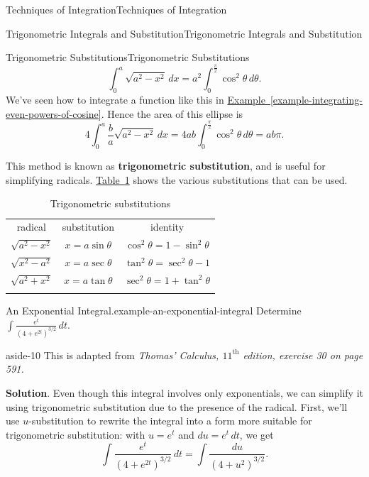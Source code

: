 \documentclass[10pt,]{book}
\newcommand{\terminology}[1]{\textbf{#1}}
\numberwithin{equation}{section}
\newcommand{\hrulethin}  {\noalign{\hrule height 0.04em}}
\newcommand{\hrulethick} {\noalign{\hrule height 0.11em}}
\begin{document}
\begin{chapterptx}{Techniques of Integration}{}{Techniques of Integration}{}{}
\begin{sectionptx}{Trigonometric Integrals and Substitution}{}{Trigonometric Integrals and Substitution}{}{}
\begin{subsectionptx}{Trigonometric Substitutions}{}{Trigonometric Substitutions}{}{}
\begin{equation*}
\int_{0}^{a}\sqrt{a^{2} - x^{2}}\,dx = a^{2}\int_{0}^{\frac{\pi}{2}}\cos^{2}\theta\,d\theta.
\end{equation*}
We've seen how to integrate a function like this in \hyperref[example-integrating-even-powers-of-cosine]{Example~\ref{example-integrating-even-powers-of-cosine}}. Hence the area of this ellipse is%
\begin{equation*}
4\int_{0}^{a}\frac{b}{a}\sqrt{a^{2} - x^{2}}\,dx = 4ab\int_{0}^{\frac{\pi}{2}}\cos^{2}\theta\,d\theta = ab\pi.
\end{equation*}
%
\par
\hypertarget{p-544}{}%
This method is known as \terminology{trigonometric substitution}, and is useful for simplifying radicals. \hyperref[table-trig-substitutions]{Table~\ref{table-trig-substitutions}} shows the various substitutions that can be used.%
\begin{table}
\centering
\begin{tabular}{ccc}\hrulethick
radical&substitution&identity\tabularnewline\hrulethin
\(\sqrt{a^{2} - x^{2}}\)&\(x = a\sin\theta\)&\(\cos^{2}\theta = 1-\sin^{2}\theta\)\tabularnewline[0pt]
\(\sqrt{x^{2} - a^{2}}\)&\(x = a\sec\theta\)&\(\tan^{2}\theta = \sec^{2}\theta - 1\)\tabularnewline[0pt]
\(\sqrt{a^{2} + x^{2}}\)&\(x = a\tan\theta\)&\(\sec^{2}\theta = 1+\tan^{2}\theta\)\tabularnewline\hrulethick
\end{tabular}
\caption{Trigonometric substitutions\label{table-trig-substitutions}}
\end{table}
\begin{example}{An Exponential Integral.}{example-an-exponential-integral}%
\hypertarget{p-545}{}%
Determine \(\displaystyle\int\frac{e^{t}}{(4 + e^{2t})^{3/2}}\,dt.\)%
\begin{aside}{}{aside-10}%
\hypertarget{p-546}{}%
This is adapted from \emph{Thomas' Calculus, \(11^{\text{th}}\) edition, exercise 30 on page 591.}%
\end{aside}
\par\smallskip%
\noindent\textbf{Solution}.\hypertarget{solution-120}{}\quad%
\hypertarget{p-547}{}%
Even though this integral involves only exponentials, we can simplify it using trigonometric substitution due to the presence of the radical. First, we'll use \(u\)-substitution to rewrite the integral into a form more suitable for trigonometric substitution: with \(u = e^{t}\) and \(du = e^{t}\,dt\), we get%
\begin{equation*}
\int\frac{e^{t}}{(4 + e^{2t})^{3/2}}\,dt = \int\frac{du}{(4 + u^{2})^{3/2}}.

\end{equation*}
\end{example}
\end{subsectionptx}
\end{sectionptx}
\end{chapterptx}
\end{document}
